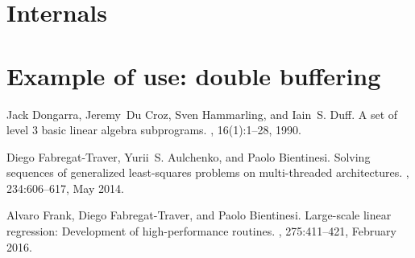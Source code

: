 \documentclass[a4paper,10pt]{article}
\begin{document}
\section{Internals}



\section{Example of use: double buffering}

%
%
\begin{thebibliography}{1}

Jack Dongarra, Jeremy~Du Croz, Sven Hammarling, and Iain~S. Duff.
\newblock A set of level 3 basic linear algebra subprograms.
, 16(1):1--28, 1990.

Diego Fabregat-Traver, Yurii~S. Aulchenko, and Paolo Bientinesi.
\newblock Solving sequences of generalized least-squares problems on
  multi-threaded architectures.
, 234:606--617, May
  2014.

Alvaro Frank, Diego Fabregat-Traver, and Paolo Bientinesi.
\newblock Large-scale linear regression: Development of high-performance
  routines.
, 275:411--421, February
  2016.

\end{thebibliography}
\end{document}
